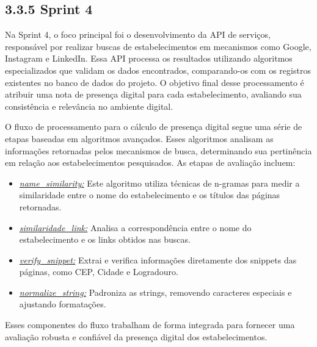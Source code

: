 
\subsection*{3.3.5 Sprint 4}
\label{unit:ages-ii-sprint-4}

\indent \originalleadingspace{}\originalleadingspace{}\originalleadingspace{}\originalleadingspace{}Na Sprint 4, o foco principal foi o desenvolvimento da API de serviços, responsável por realizar buscas de estabelecimentos em mecanismos como Google, Instagram e LinkedIn. Essa API processa os resultados utilizando algoritmos especializados que validam os dados encontrados, comparando-os com os registros existentes no banco de dados do projeto. O objetivo final desse processamento é atribuir uma nota de presença digital para cada estabelecimento, avaliando sua consistência e relevância no ambiente digital.\originalspace{}\par

\indent O fluxo de processamento para o cálculo de presença digital segue uma série de etapas baseadas em algoritmos avançados. Esses algoritmos analisam as informações retornadas pelos mecanismos de busca, determinando sua pertinência em relação aos estabelecimentos pesquisados. As etapas de avaliação incluem:\par

\begin{itemize}
\item \textit{\underline{name\_similarity:}} Este algoritmo utiliza técnicas de n-gramas para medir a similaridade entre o nome do estabelecimento e os títulos das páginas retornadas.
\item \textit{\underline{similaridade\_link:}} Analisa a correspondência entre o nome do estabelecimento e os links obtidos nas buscas.
\item \textit{\underline{verify\_snippet:}} Extrai e verifica informações diretamente dos snippets das páginas, como CEP, Cidade e Logradouro.
\item \textit{\underline{normalize\_string:}} Padroniza as strings, removendo caracteres especiais e ajustando formatações.
\end{itemize}

\indent Esses componentes do fluxo trabalham de forma integrada para fornecer uma avaliação robusta e confiável da presença digital dos estabelecimentos.\par

